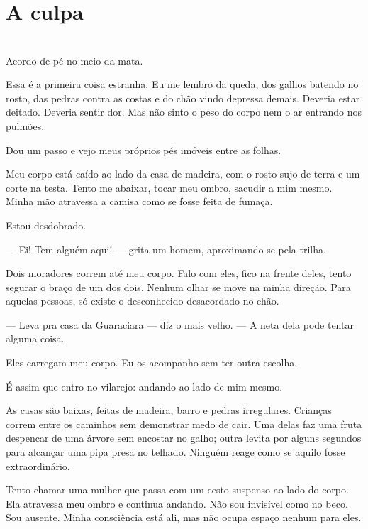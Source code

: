 \newpage

\ifdefined\useChapters
\chapter{A culpa}
\else
\chapter{}
\fi

Acordo de pé no meio da mata.

Essa é a primeira coisa estranha. Eu me lembro da queda, dos galhos batendo no rosto, das pedras contra as costas e do chão vindo depressa demais. Deveria estar deitado. Deveria sentir dor. Mas não sinto o peso do corpo nem o ar entrando nos pulmões.

Dou um passo e vejo meus próprios pés imóveis entre as folhas.

Meu corpo está caído ao lado da casa de madeira, com o rosto sujo de terra e um corte na testa. Tento me abaixar, tocar meu ombro, sacudir a mim mesmo. Minha mão atravessa a camisa como se fosse feita de fumaça.

Estou desdobrado.

— Ei! Tem alguém aqui! — grita um homem, aproximando-se pela trilha.

Dois moradores correm até meu corpo. Falo com eles, fico na frente deles, tento segurar o braço de um dos dois. Nenhum olhar se move na minha direção. Para aquelas pessoas, só existe o desconhecido desacordado no chão.

— Leva pra casa da Guaraciara — diz o mais velho. — A neta dela pode tentar alguma coisa.

Eles carregam meu corpo. Eu os acompanho sem ter outra escolha.

É assim que entro no vilarejo: andando ao lado de mim mesmo.

As casas são baixas, feitas de madeira, barro e pedras irregulares. Crianças correm entre os caminhos sem demonstrar medo de cair. Uma delas faz uma fruta despencar de uma árvore sem encostar no galho; outra levita por alguns segundos para alcançar uma pipa presa no telhado. Ninguém reage como se aquilo fosse extraordinário.

Tento chamar uma mulher que passa com um cesto suspenso ao lado do corpo. Ela atravessa meu ombro e continua andando. Não sou invisível como no beco. Sou ausente. Minha consciência está ali, mas não ocupa espaço nenhum para eles.

